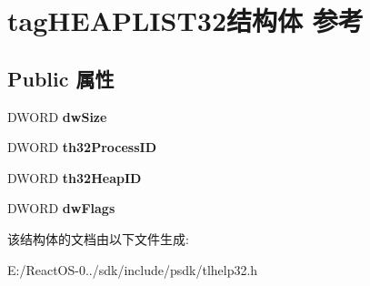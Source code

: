 \hypertarget{structtag_h_e_a_p_l_i_s_t32}{}\section{tag\+H\+E\+A\+P\+L\+I\+S\+T32结构体 参考}
\label{structtag_h_e_a_p_l_i_s_t32}
\subsection*{Public 属性}
\begin{DoxyCompactItemize}
\item 
\mbox{\label{structtag_h_e_a_p_l_i_s_t32_a91dc8da4a20dc4d359574127e90e79a8}} 
D\+W\+O\+RD {\bfseries dw\+Size}
\item 
\mbox{\label{structtag_h_e_a_p_l_i_s_t32_aa6e1131090d72605d1ad62a34b556691}} 
D\+W\+O\+RD {\bfseries th32\+Process\+ID}
\item 
\mbox{\label{structtag_h_e_a_p_l_i_s_t32_a43c9e416d1126c79a407f37c126e4573}} 
D\+W\+O\+RD {\bfseries th32\+Heap\+ID}
\item 
\mbox{\label{structtag_h_e_a_p_l_i_s_t32_a342d37d6e64d3b8e62f70734dab1dc9f}} 
D\+W\+O\+RD {\bfseries dw\+Flags}
\end{DoxyCompactItemize}


该结构体的文档由以下文件生成\+:\begin{DoxyCompactItemize}
\item 
E\+:/\+React\+O\+S-\/0../sdk/include/psdk/tlhelp32.\+h\end{DoxyCompactItemize}
